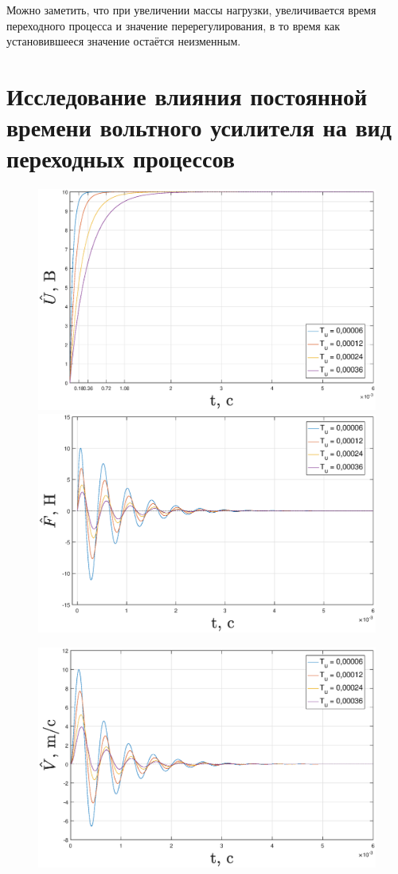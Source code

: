 \documentclass[fleqn, a4paper, 11pt, russian]{article}
\begin{document}
	Можно заметить, что при увеличении массы нагрузки, увеличивается время переходного процесса и значение перерегулирования, в то время как установившееся значение остаётся неизменным.
	\clearpage
	{\centering
		\section{Исследование влияния постоянной времени вольтного усилителя на вид переходных процессов}
	}
	\begin{figure}[ht!]
		\centering
		\includegraphics[width = \textwidth]{tvar/tvarU}
		
		\includegraphics[width = \textwidth]{tvar/tvarF}
	\end{figure}
	\begin{figure}[ht!]
		\includegraphics[width = \textwidth]{tvar/tvarV}
	\end{figure}
\end{document}
